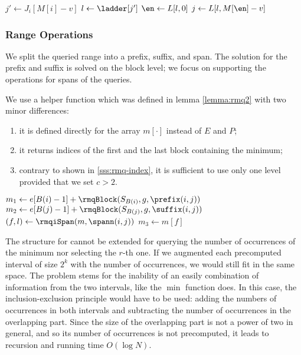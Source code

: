 \begin{algorithm}
\begin{algorithmic}
	\State $j' \gets J_i[M[i] - v]$ 
	\State $l \gets \ladder[j']$ 
	\State $\en \gets L[l, 0]$
	\State $j \gets L[l, M[\en] - v]$ 
	\State {}
\EndFunction
\end{algorithmic}
\end{algorithm}

\subsubsection{Range Operations}

We split the queried range into a prefix, suffix, and span.
The solution for the prefix and suffix is solved on the block level; we focus on supporting the operations for spans of the queries.

We use a helper function \rmqiSpan{} which was defined in lemma \ref{lemma:rmq2} with two minor differences:
\begin{enumerate}
	\item it is defined directly for the array $m[\cdot]$ instead of $E$ and $P$;
	\item it returns indices of the first and the last block containing the minimum;
	\item contrary to \rmqi{} shown in \ref{sss:rmq-index}, it is sufficient to use only one level provided that we set $c > 2$.
\end{enumerate}

\begin{algorithm}
\begin{algorithmic}
	\State $m_1 \gets e[B(i) - 1] + \rmqBlock(S_{B(i)}, g, \prefix(i, j))$
	\State $m_2 \gets e[B(j) - 1] + \rmqBlock(S_{B(j)}, g, \suffix(i, j))$
	\State $(f, l) \gets \rmqiSpan(m, \spann(i, j))$
	\State $m_3 \gets m[f]$
	\State {}
\EndFunction
\end{algorithmic}
\end{algorithm}

The structure for \rmqiSpan{} cannot be extended for querying the number of occurrences of the minimum nor selecting the $r$-th one.
If we augmented each precomputed interval of size $2^k$ with the number of occurrences, we would still fit in the same space.
The problem stems for the inability of an easily combination of information from the two intervals, like the $\min$ function does.
In this case, the inclusion-exclusion principle would have to be used: adding the numbers of occurrences in both intervals and subtracting the number of occurrences in the overlapping part.
Since the size of the overlapping part is not a power of two in general, and so its number of occurrences is not precomputed, it leads to recursion and running time $O(\log N)$.

